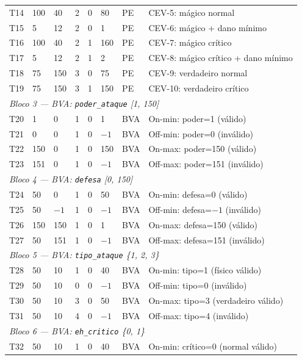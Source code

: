 \documentclass[conference, onecolumn]{IEEEtran}
\begin{document}
\begin{longtable}{@{}p{0.5cm}p{0.8cm}p{0.8cm}p{0.5cm}p{0.7cm}p{1.0cm}p{0.9cm}p{3.5cm}@{}}
T14 & 100 & 40  & 2 & 0 & 80  & PE & CEV-5: mágico normal \\
T15 & 5   & 12  & 2 & 0 & 1   & PE & CEV-6: mágico + dano mínimo \\
T16 & 100 & 40  & 2 & 1 & 160 & PE & CEV-7: mágico crítico \\
T17 & 5   & 12  & 2 & 1 & 2   & PE & CEV-8: mágico crítico + dano mínimo \\
T18 & 75  & 150 & 3 & 0 & 75  & PE & CEV-9: verdadeiro normal \\
T19 & 75  & 150 & 3 & 1 & 150 & PE & CEV-10: verdadeiro crítico \\
\midrule
\multicolumn{8}{l}{\textit{Bloco 3 — BVA: \texttt{poder\_ataque} {[}1, 150{]}}} \\
T20 & 1   & 0  & 1 & 0 & 1    & BVA & On-min: poder=1 (válido) \\
T21 & 0   & 0  & 1 & 0 & $-1$ & BVA & Off-min: poder=0 (inválido) \\
T22 & 150 & 0  & 1 & 0 & 150  & BVA & On-max: poder=150 (válido) \\
T23 & 151 & 0  & 1 & 0 & $-1$ & BVA & Off-max: poder=151 (inválido) \\
\midrule
\multicolumn{8}{l}{\textit{Bloco 4 — BVA: \texttt{defesa} {[}0, 150{]}}} \\
T24 & 50  & 0   & 1 & 0 & 50   & BVA & On-min: defesa=0 (válido) \\
T25 & 50  & $-1$& 1 & 0 & $-1$ & BVA & Off-min: defesa=$-1$ (inválido) \\
T26 & 150 & 150 & 1 & 0 & 1    & BVA & On-max: defesa=150 (válido) \\
T27 & 50  & 151 & 1 & 0 & $-1$ & BVA & Off-max: defesa=151 (inválido) \\
\midrule
\multicolumn{8}{l}{\textit{Bloco 5 — BVA: \texttt{tipo\_ataque} \{1, 2, 3\}}} \\
T28 & 50 & 10 & 1 & 0 & 40   & BVA & On-min: tipo=1 (físico válido) \\
T29 & 50 & 10 & 0 & 0 & $-1$ & BVA & Off-min: tipo=0 (inválido) \\
T30 & 50 & 10 & 3 & 0 & 50   & BVA & On-max: tipo=3 (verdadeiro válido) \\
T31 & 50 & 10 & 4 & 0 & $-1$ & BVA & Off-max: tipo=4 (inválido) \\
\midrule
\multicolumn{8}{l}{\textit{Bloco 6 — BVA: \texttt{eh\_critico} \{0, 1\}}} \\
T32 & 50 & 10 & 1 & 0  & 40   & BVA & On-min: crítico=0 (normal válido) \\

\end{longtable}
\end{document}
